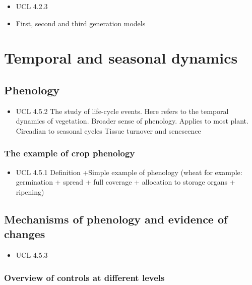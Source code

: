 \documentclass[oneside]{book}
\providecommand{\tightlist}{%
  \setlength{\itemsep}{0pt}\setlength{\parskip}{0pt}}
\begin{document}
\begin{itemize}
\tightlist
\item
  UCL 4.2.3
\item
  First, second and third generation models
\end{itemize}

\chapter{Temporal and seasonal
dynamics}\label{temporal-and-seasonal-dynamics}


\section{Phenology}\label{phenology}

\begin{itemize}
\tightlist
\item
  UCL 4.5.2 The study of life-cycle events. Here refers to the temporal
  dynamics of vegetation. Broader sense of phenology. Applies to most
  plant. Circadian to seasonal cycles Tissue turnover and senescence
\end{itemize}

\subsection{The example of crop
phenology}\label{the-example-of-crop-phenology}

\begin{itemize}
\tightlist
\item
  UCL 4.5.1 Definition +Simple example of phenology (wheat for example:
  germination + spread + full coverage + allocation to storage organs +
  ripening)
\end{itemize}

\section{Mechanisms of phenology and evidence of
changes}\label{mechanisms-of-phenology-and-evidence-of-changes}

\begin{itemize}
\tightlist
\item
  UCL 4.5.3
\end{itemize}

\subsection{Overview of controls at different
levels}\label{overview-of-controls-at-different-levels}
\end{document}
